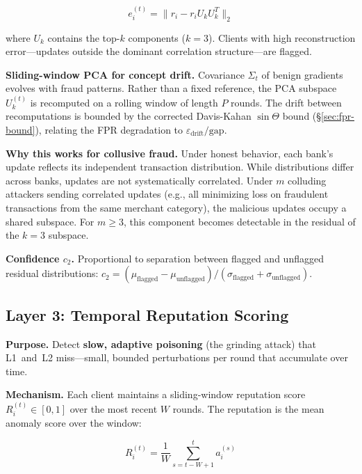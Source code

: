 \documentclass[10pt,journal]{IEEEtran}
\begin{document}
\begin{equation}
e_i^{(t)} = \| r_i - r_i U_k U_k^T \|_2
\end{equation}

where $U_k$ contains the top-$k$ components ($k=3$). Clients with high reconstruction error---updates outside the dominant correlation structure---are flagged.

\textbf{Sliding-window PCA for concept drift.} Covariance $\Sigma_t$ of benign gradients evolves with fraud patterns. Rather than a fixed reference, the PCA subspace $U_k^{(t)}$ is recomputed on a rolling window of length $P$ rounds. The drift between recomputations is bounded by the corrected Davis-Kahan $\sin\Theta$ bound (\S\ref{sec:fpr-bound}), relating the FPR degradation to $\varepsilon_{\text{drift}} / \text{gap}$.

\textbf{Why this works for collusive fraud.} Under honest behavior, each bank's update reflects its independent transaction distribution. While distributions differ across banks, updates are not systematically correlated. Under $m$ colluding attackers sending correlated updates (e.g., all minimizing loss on fraudulent transactions from the same merchant category), the malicious updates occupy a shared subspace. For $m \ge 3$, this component becomes detectable in the residual of the $k=3$ subspace.

\textbf{Confidence $c_2$.} Proportional to separation between flagged and unflagged residual distributions: $c_2 = (\mu_{\text{flagged}} - \mu_{\text{unflagged}}) / (\sigma_{\text{flagged}} + \sigma_{\text{unflagged}})$.

\subsection{Layer 3: Temporal Reputation Scoring}
\label{sec:l3}

\textbf{Purpose.} Detect \textbf{slow, adaptive poisoning} (the grinding attack) that L1~and~L2 miss---small, bounded perturbations per round that accumulate over time.

\textbf{Mechanism.} Each client maintains a sliding-window reputation score $R_i^{(t)} \in [0,1]$ over the most recent $W$ rounds. The reputation is the mean anomaly score over the window:

\begin{equation}
R_i^{(t)} = \frac{1}{W} \sum_{s=t-W+1}^{t} a_i^{(s)}
\label{eq:sliding-rep}
\end{equation}
\end{document}
